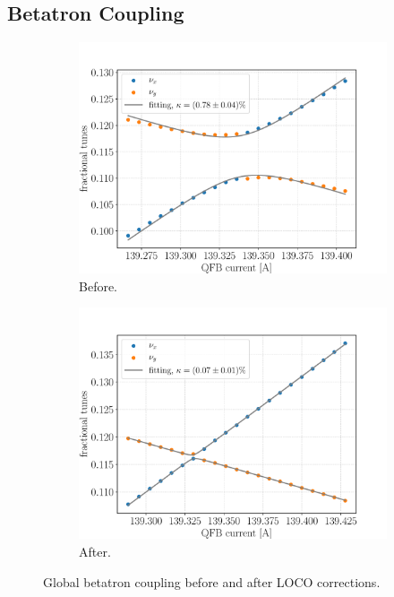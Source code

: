 \subsection{Betatron Coupling}
\begin{figure}
\centering
\begin{subfigure}[t]{0.49\textwidth}
\includegraphics[width=1.0\textwidth]{figures/coupling_before_loco_grid.pdf}
    \caption{Before.}
    \label{subfig:coup_before}
\end{subfigure}
 \begin{subfigure}[t]{0.49\textwidth}
\includegraphics[width=1.0\textwidth]{figures/coupling_after_loco_grid.pdf}
    \caption{After.}
    \label{subfig:coup_after}
\end{subfigure}
\caption{Global betatron coupling before and after LOCO corrections.}
\label{fig:global_coupling}
\end{figure}

